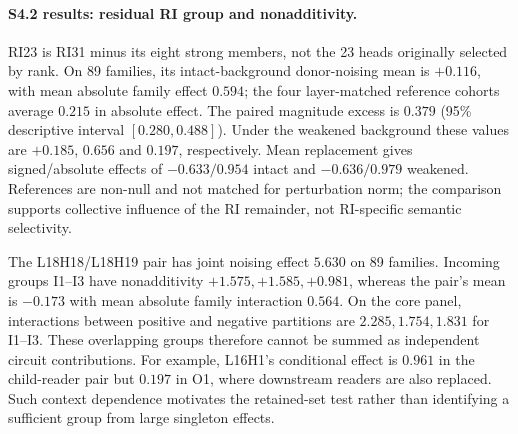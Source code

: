 \paragraph{S4.2 results: residual RI group and nonadditivity.}
\label{app:s42-residual-results}
RI23 is RI31 minus its eight strong members, not the 23 heads originally
selected by rank. On 89 families, its intact-background donor-noising mean is
$+0.116$, with mean absolute family effect $0.594$; the four layer-matched
reference cohorts average $0.215$ in absolute effect. The paired magnitude
excess is $0.379$ (95\% descriptive interval $[0.280,0.488]$).
Under the weakened background these values are $+0.185$, $0.656$ and $0.197$,
respectively. Mean replacement gives signed/absolute effects of
$-0.633/0.954$ intact and $-0.636/0.979$ weakened. References are non-null and
not matched for perturbation norm; the comparison supports collective influence
of the RI remainder, not RI-specific semantic selectivity.

The L18H18/L18H19 pair has joint noising effect $5.630$ on 89 families.
Incoming groups I1--I3 have nonadditivity $+1.575,+1.585,+0.981$, whereas the
pair's mean is $-0.173$ with mean absolute family interaction $0.564$.
On the core panel, interactions between positive and negative partitions are
$2.285,1.754,1.831$ for I1--I3. These overlapping groups therefore cannot be
summed as independent circuit contributions. For example, L16H1's conditional
effect is $0.961$ in the child-reader pair but $0.197$ in O1, where downstream
readers are also replaced. Such context dependence motivates the retained-set
test rather than identifying a sufficient group from large singleton effects.


